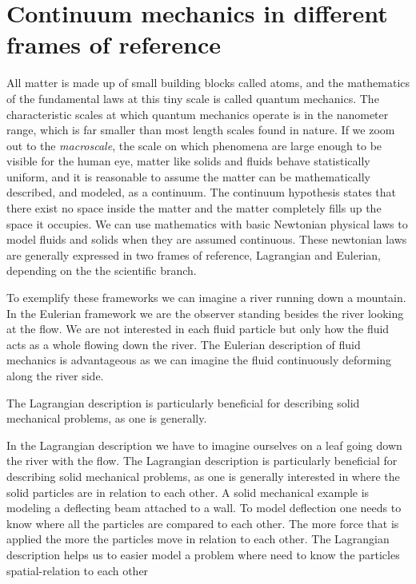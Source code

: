 \chapter{Continuum mechanics in different frames of reference}
All matter is made up of small building blocks called atoms, and the mathematics of the fundamental laws at this tiny scale is called quantum mechanics. The characteristic scales at which quantum mechanics operate is in the nanometer range, which is far smaller than most length scales found in nature.
If we zoom out to the \textit{macroscale}, the scale on which phenomena are large enough to be visible for the human eye, matter like solids and fluids behave statistically uniform, and it is reasonable to assume the matter can be mathematically described, and modeled, as a continuum. The continuum hypothesis states that there exist no space inside the matter and the matter completely fills up the space it occupies. 
We can use mathematics with basic Newtonian physical laws to model fluids and solids when they are assumed continuous. These newtonian laws are generally expressed in two frames of reference, Lagrangian and Eulerian, depending on the the scientific branch. \newline

To exemplify these frameworks we can imagine a river running down a mountain.	
In the Eulerian framework we are the observer standing besides the river looking at the flow. We are not interested in each fluid particle but only how the fluid acts as a whole flowing down the river. The Eulerian description of fluid mechanics is advantageous as we can imagine the fluid continuously deforming along the river side. \newline

The Lagrangian description is particularly beneficial for describing solid mechanical problems, as one is generally.

In the Lagrangian description we have to imagine ourselves on a leaf going down the river with the flow.  The Lagrangian description is particularly beneficial for describing solid mechanical problems, as one is generally interested in where the solid particles are in relation to each other. A solid mechanical example is modeling a deflecting beam attached to a wall. To model deflection one needs to know where all the particles are compared to each other. The more force that is applied the more the particles move in relation to each other. The Lagrangian description helps us to easier model a problem where need to know the particles spatial-relation to each other \newline

